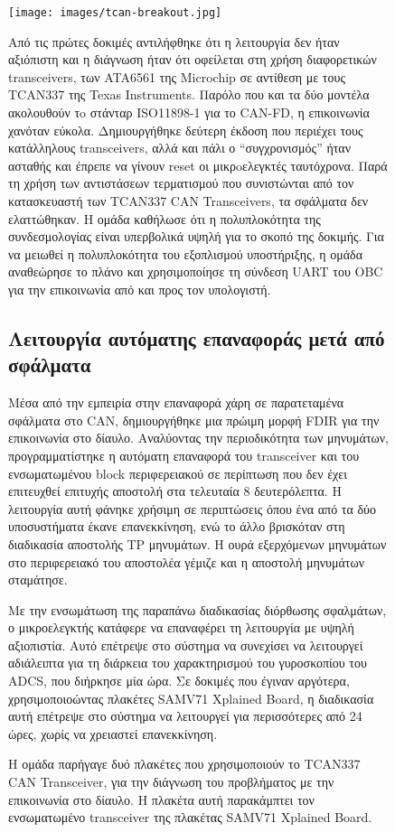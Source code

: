 \documentclass[a4paper,nobib,justified]{tufte-book}
\begin{document}
\begin{figure}
\begin{marginfigure}
	\texttt{[image: images/tcan-breakout.jpg]}
	\label{fig:tcan-breakout}
	\caption[Συνδεσμολογία TCAN337 Breakout PCB]{Η ομάδα παρήγαγε δυό πλακέτες που χρησιμοποιούν το TCAN337 CAN Transceiver, για την διάγνωση του προβλήματος με την επικοινωνία στο δίαυλο. Η πλακέτα αυτή παρακάμπτει τον ενσωματωμένο transceiver της πλακέτας SAMV71 Xplained Board.}
\end{marginfigure}
Από τις πρώτες δοκιμές αντιλήφθηκε ότι η λειτουργία δεν ήταν αξιόπιστη και η διάγνωση ήταν ότι οφείλεται στη χρήση διαφορετικών transceivers, των ATA6561 της Microchip σε αντίθεση με τους TCAN337 της Texas Instruments. Παρόλο που και τα δύο μοντέλα ακολουθούν τo στάνταρ ISO11898-1 για το CAN-FD, η επικοινωνία χανόταν εύκολα. Δημιουργήθηκε δεύτερη έκδοση που περιέχει τους κατάλληλους transceivers, αλλά και πάλι ο “συγχρονισμός” ήταν ασταθής και έπρεπε να γίνουν reset οι μικρoελεγκτές ταυτόχρονα. Παρά τη χρήση των αντιστάσεων τερματισμού που συνιστώνται από τον κατασκευαστή των TCAN337 CAN Transceivers, τα σφάλματα δεν ελαττώθηκαν. Η ομάδα καθήλωσε ότι η πολυπλοκότητα της συνδεσμολογίας είναι υπερβολικά υψηλή για το σκοπό της δοκιμής. Για να μειωθεί η πολυπλοκότητα του εξοπλισμού υποστήριξης, η ομάδα αναθεώρησε το πλάνο και χρησιμοποίησε τη σύνδεση UART του OBC για την επικοινωνία από και προς τον υπολογιστή.
\subsection{Λειτουργία αυτόματης επαναφοράς μετά από σφάλματα}
Μέσα από την εμπειρία στην επαναφορά χάρη σε παρατεταμένα σφάλματα στο CAN, δημιουργήθηκε μια πρώιμη μορφή FDIR για την επικοινωνία στο δίαυλο. Αναλύοντας την περιοδικότητα των μηνυμάτων, προγραμματίστηκε η αυτόματη επαναφορά του transceiver και του ενσωματωμένου block περιφερειακού σε περίπτωση που δεν έχει επιτευχθεί επιτυχής αποστολή στα τελευταία 8 δευτερόλεπτα. Η λειτουργία αυτή φάνηκε χρήσιμη σε περιπτώσεις όπου ένα από τα δύο υποσυστήματα έκανε επανεκκίνηση, ενώ το άλλο βρισκόταν στη διαδικασία αποστολής TP μηνυμάτων. Η ουρά εξερχόμενων μηνυμάτων στο περιφερειακό του αποστολέα γέμιζε και η αποστολή μηνυμάτων σταμάτησε.

Με την ενσωμάτωση της παραπάνω διαδικασίας διόρθωσης σφαλμάτων, ο μικροελεγκτής κατάφερε να επαναφέρει τη λειτουργία με υψηλή αξιοπιστία. Αυτό επέτρεψε στο σύστημα να συνεχίσει να λειτουργεί αδιάλειπτα για τη διάρκεια του χαρακτηρισμού του γυροσκοπίου του ADCS, που διήρκησε μία ώρα. Σε δοκιμές που έγιναν αργότερα, χρησιμοποιοώντας πλακέτες SAMV71 Xplained Board, η διαδικασία αυτή επέτρεψε στο σύστημα να λειτουργεί για περισσότερες από 24 ώρες, χωρίς να χρειαστεί επανεκκίνηση.


\end{figure}
\end{document}
